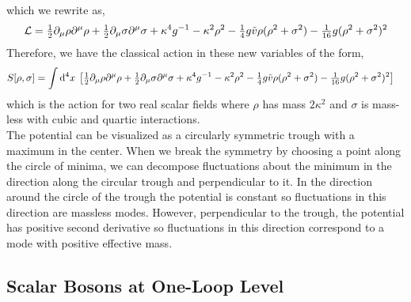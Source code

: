 \documentclass[12pt]{article}
\begin{document}
which we rewrite as,
\[ \mathcal{L} = \tfrac{1}{2} \partial_\mu \rho \partial^\mu \rho + \tfrac{1}{2} \partial_\mu \sigma \partial^\mu \sigma + \kappa^4 g^{-1} - \kappa^2 \rho^2 - \tfrac{1}{4} g \tilde{v} \rho (\rho^2 + \sigma^2) - \tfrac{1}{16} g (\rho^2 + \sigma^2)^2 \]
Therefore, we have the classical action in these new variables of the form,
\begin{align*}
S[\rho, \sigma] & = \int \mathrm{d}^{4} x \: \left[ \tfrac{1}{2} \partial_\mu \rho \partial^\mu \rho + \tfrac{1}{2} \partial_\mu \sigma \partial^\mu \sigma + \kappa^4 g^{-1} - \kappa^2 \rho^2 - \tfrac{1}{4} g \tilde{v} \rho (\rho^2 + \sigma^2) - \tfrac{1}{16} g (\rho^2 + \sigma^2)^2 \right] 
\end{align*}
which is the action for two real scalar fields where $\rho$ has mass $2 \kappa^2$ and $\sigma$ is mass-less with cubic and quartic interactions. 
\bigskip\\
The potential can be visualized as a circularly symmetric trough with a maximum in the center. When we break the symmetry by choosing a point along the circle of minima, we can decompose fluctuations about the minimum in the direction along the circular trough and perpendicular to it. In the direction around the circle of the trough the potential is constant so fluctuations in this direction are massless modes. However, perpendicular to the trough, the potential has positive second derivative so fluctuations in this direction correspond to a mode with positive effective mass.

\subsection{Scalar Bosons at One-Loop Level}
\end{document}
